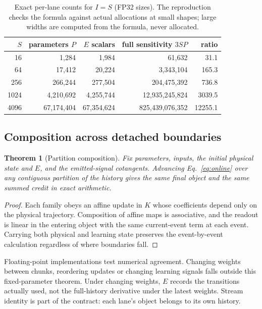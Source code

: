 \documentclass[11pt]{article}
\newtheorem{theorem}{Theorem}
\theoremstyle{definition}
\begin{document}
\begin{table}[t]
\centering\small
\caption{Exact per-lane counts for $I=S$ (FP32 sizes). The reproduction checks the
formula against actual allocations at small shapes; large widths are computed from
the formula, never allocated.}
\label{tab:storage}
\begin{tabular}{rrrrr}
\toprule
$S$ & parameters $P$ & $E$ scalars & full sensitivity $3SP$ & ratio\\
\midrule
16 & 1,284 & 1,984 & 61,632 & 31.1\\
64 & 17,412 & 20,224 & 3,343,104 & 165.3\\
256 & 266,244 & 277,504 & 204,475,392 & 736.8\\
1024 & 4,210,692 & 4,255,744 & 12,935,245,824 & 3039.5\\
4096 & 67,174,404 & 67,354,624 & 825,439,076,352 & 12255.1\\
\bottomrule
\end{tabular}
\end{table}

\subsection{Composition across detached boundaries}
\label{sec:composition}
\begin{theorem}[Partition composition]
\label{thm:partition}
Fix parameters, inputs, the initial physical state and $E$, and the emitted-signal
cotangents. Advancing Eq.~\eqref{eq:online} over any contiguous partition of the
history gives the same final object and the same summed credit in exact
arithmetic.
\end{theorem}
\begin{proof}
Each family obeys an affine update in $K$ whose coefficients depend only on the
physical trajectory. Composition of affine maps is associative, and the readout is
linear in the entering object with the same current-event term at each event.
Carrying both physical and learning state preserves the event-by-event
calculation regardless of where boundaries fall.
\end{proof}
Floating-point implementations test numerical agreement. Changing weights between
chunks, reordering updates or changing learning signals falls outside this
fixed-parameter theorem. Under changing weights, $E$ records the transitions
actually used, not the full-history derivative under the latest weights. Stream
identity is part of the contract: each lane's object belongs to its own history.
\end{document}
